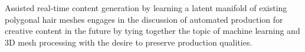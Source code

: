 \documentclass[ %
author={Dillon Keith Diep},
supervisor={Dr. Carl Henrik Ek},
degree={MEng},
title={ART-CG Hair:},
subtitle={Assisted Real-time Content Generation of Stylised Virtual Hair},
type={Research},
year={2017} ]{dissertation}
\begin{document}
Assisted real-time content generation by learning a latent manifold of existing polygonal hair meshes engages in the discussion of automated production for creative content in the future by tying together the topic of machine learning and 3D mesh processing with the desire to preserve production qualities.


%
%

\backmatter





\appendix


\end{document}
